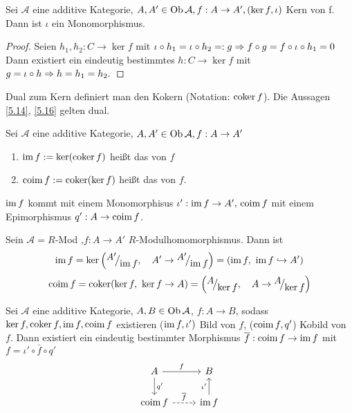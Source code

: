 \begin{bem}\label{5.16}
	Sei $\mathcal{A} $ eine additive Kategorie, $ A,A' \in \text{Ob}\,\mathcal{A}, f: A  \to A' , (\ker f, \iota) $ Kern von f. Dann ist $\iota$ ein Monomorphismus. 
\end{bem}
\begin{proof}
	Seien $ h_1,h_2: C \to \ker f $ mit $ \iota\circ h_1 = \iota \circ h_2 =:g \Rightarrow f \circ g = f \circ \iota \circ h_1 = 0 $ Dann existiert ein eindeutig bestimmtes $h: C \to \ker f $ mit $ g = \iota\circ h \Rightarrow h = h_1 = h_2. $
\end{proof}
\begin{bem+df}\label{5.17}
	Dual zum Kern definiert man den Kokern (Notation: $ \operatorname{coker} f$). Die Aussagen \ref{5.14}, \ref{5.16} gelten dual.
\end{bem+df}
\begin{df}\label{5.18}
	 Sei $\mathcal{A} $ eine additive Kategorie, $ A,A' \in \text{Ob}\,\mathcal{A}, f: A \to A'$ 
	 \begin{enumerate}
	 \item[] $\operatorname{im} f := \ker(\operatorname{coker} f) $ heißt das  von $f$ 
	 \item[] $\operatorname{coim} f := \operatorname{coker}(\ker f) $ heißt das  von $f$.
	\end{enumerate}
\end{df}
\begin{anm}
	$\operatorname{im} f $ kommt mit einem Monomorphisus $\iota': \operatorname{im} f \to A' ,\, \operatorname{coim} f $ mit einem Epimorphismus $ q': A \to \operatorname{coim} f $.
\end{anm}
\begin{bsp}
	Sein $\mathcal{A} = R $-Mod ,$ f: A  \to A' $ $R$-Modulhomomorphismus. Dann ist 
	$$\im f = \ker\left(\QR{A'}{\im f},\quad  A' \to \QR{A'}{\im f}\right) = (\im f, \ \im f \hookrightarrow A')$$
	$$\coim f= \coker(\ker f, \ \ker f \to A) = \left(\QR{A}{\ker f},\quad  A \to \QR{A}{\ker f}\right)$$
\end{bsp}
\begin{bem}\label{5.20}
	Sei $\mathcal{A}$ eine additive Kategorie, $A,B\in \text{Ob}\,\mathcal{A}$, $f:A\to B$, sodass $\ker f, \operatorname{coker} f, \operatorname{im} f, \operatorname{coim} f$ existieren ($\operatorname{im} f, \iota')$ Bild von $f$, ($\operatorname{coim} f, q'$) Kobild von $f$. Dann existiert ein eindeutig bestimmter Morphismus $\overline f: \operatorname{coim} f \to \operatorname{im} f$ mit $f= \iota' \circ \bar f \circ q'$
	$$\begin{tikzcd}
	A \arrow{r}{f} \arrow{d}{q'} & B \\
	\coim f \arrow[dashed]{r}{\bar f} & \im f \arrow{u}{\iota'}
	\end{tikzcd}$$
\end{bem}
